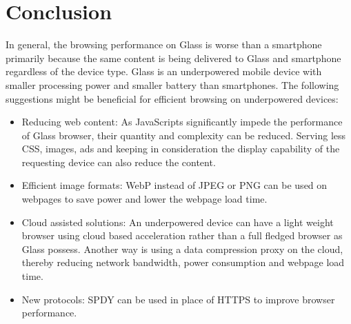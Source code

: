 \documentclass{sig-alternate-10pt}
\begin{document}
\section{Conclusion}
In general, the browsing  performance  on Glass is worse than  a smartphone primarily   because the same content is being delivered to Glass and smartphone regardless of the device type. Glass is an underpowered mobile device with smaller processing power  and  smaller battery than smartphones. The following suggestions might be beneficial for efficient  browsing on underpowered devices: 
\begin{itemize}
\item Reducing web content: As JavaScripts significantly impede the   performance of  Glass browser, their  quantity and complexity can be reduced.  Serving less CSS, images, ads and keeping in consideration the display capability of the requesting device can also reduce the content. 
\item Efficient image formats: WebP  instead of JPEG or PNG can be used on webpages to  save power and lower the webpage load time.






   






\item Cloud assisted solutions: An underpowered device can have a light weight browser using cloud based acceleration rather than a full fledged browser as  Glass possess. Another way is    using a data compression proxy  on the cloud, thereby reducing network bandwidth, power consumption and webpage load time.
\item New protocols: SPDY can be used in place of HTTPS to improve  browser performance.

\end{itemize} 



    
\end{document}
